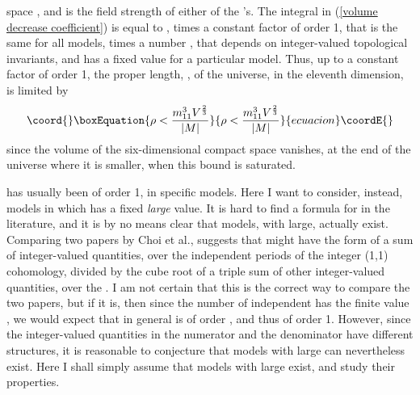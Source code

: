 \documentclass[a4paper,12pt,oneside]{article}
\begin{document}
space \coordHE{}, and \coordHE{} is the field strength of either of the 
\coordHE{}'s.  The integral in
(\ref{volume decrease coefficient}) is equal to 
\coordHE{}, times a constant factor of order 1, that is the 
same for all models, times a number \coordHE{}, that depends on 
integer-valued topological invariants, and has a fixed value for a
particular model.  Thus, up to a constant 
factor of order 1, the proper length, \myHighlight{$\rho$}\coordHE{}, of the universe, in 
the eleventh dimension, is limited by
\begin{equation}\coord{}\boxEquation{\label{limit on rho}
\rho < \frac{m_{11}^3V^{\frac{2}{3}}}{\vert M\vert}
}{\rho < \frac{m_{11}^3V^{\frac{2}{3}}}{\vert M\vert}
}{ecuacion}\coordE{}\end{equation}
since the volume of the six-dimensional compact space vanishes, at
the end of the universe where it is smaller, when this bound is
saturated.

\coordHE{} has usually been of order 1, in specific models.  Here I want to
consider, instead, models in which \coordHE{} has a
fixed \emph{large} value.  It is hard to find a formula for \coordHE{} in 
the literature, and it is by no means clear that models, with 
\coordHE{} large, actually exist.  Comparing two papers 
\cite{Choi1, Choi2} by Choi et al., suggests that \coordHE{} might have the form 
of a sum of integer-valued quantities, over the independent periods 
\coordHE{} of the integer (1,1) cohomology, divided by the cube root
of a triple sum of other integer-valued quantities, over the 
\coordHE{}.  I am not certain that this is the correct way to 
compare the two papers, but if it is, then since the number of
independent \coordHE{} has the finite value \coordHE{}, we would expect that in general \coordHE{} is of 
order 
\coordHE{}, and thus of order 1.  However, since the
integer-valued quantities in the numerator and the denominator have
different structures, it is reasonable to conjecture that models 
with large \coordHE{} can nevertheless exist.  Here I shall 
simply assume that models with large \coordHE{} exist, and
study their properties.
\end{document}
